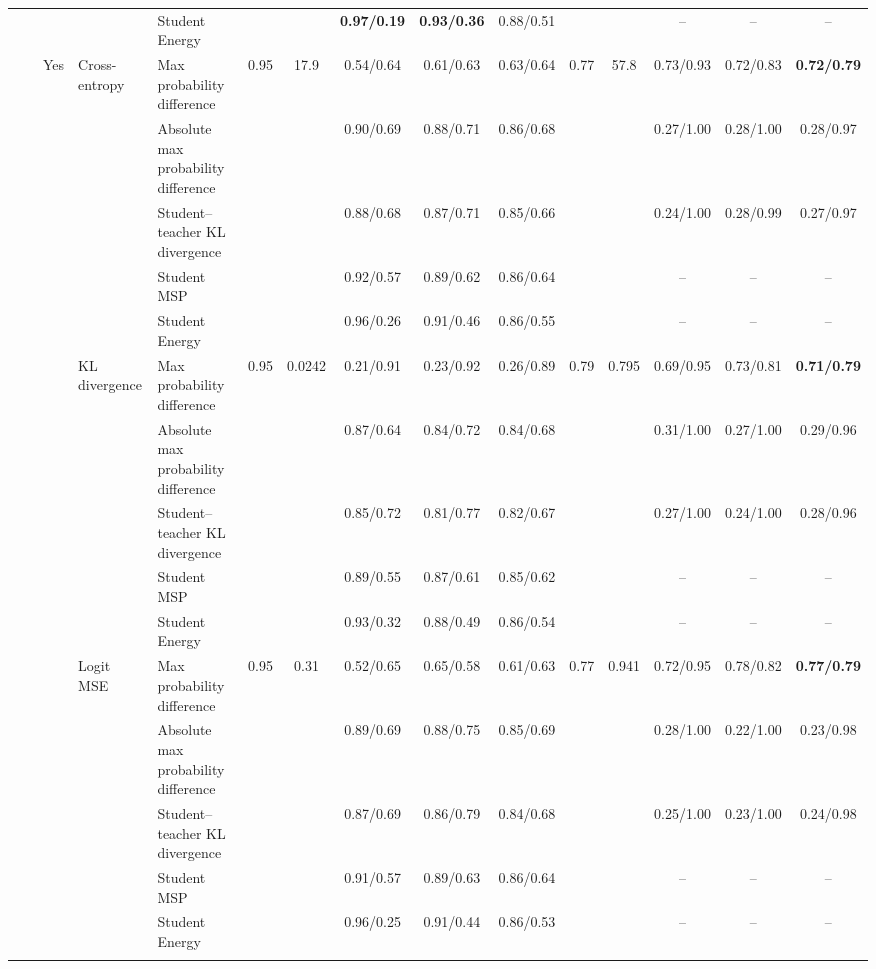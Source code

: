 \documentclass[border=2pt]{standalone}
\begin{document}
\begin{tabular}{lllllcccccccccc}
 &  &  &  & Student Energy &  &  & \textbf{0.97/0.19} & \textbf{0.93/0.36} & 0.88/0.51 &  &  & -- & -- & -- \\
 &  & Yes & Cross-entropy & Max probability difference & 0.95 & 17.9 & 0.54/0.64 & 0.61/0.63 & 0.63/0.64 & 0.77 & 57.8 & 0.73/0.93 & 0.72/0.83 & \textbf{0.72/0.79} \\
 &  &  &  & Absolute max probability difference &  &  & 0.90/0.69 & 0.88/0.71 & 0.86/0.68 &  &  & 0.27/1.00 & 0.28/1.00 & 0.28/0.97 \\
 &  &  &  & Student--teacher KL divergence &  &  & 0.88/0.68 & 0.87/0.71 & 0.85/0.66 &  &  & 0.24/1.00 & 0.28/0.99 & 0.27/0.97 \\
 &  &  &  & Student MSP &  &  & 0.92/0.57 & 0.89/0.62 & 0.86/0.64 &  &  & -- & -- & -- \\
 &  &  &  & Student Energy &  &  & 0.96/0.26 & 0.91/0.46 & 0.86/0.55 &  &  & -- & -- & -- \\
 &  &  & KL divergence & Max probability difference & 0.95 & 0.0242 & 0.21/0.91 & 0.23/0.92 & 0.26/0.89 & 0.79 & 0.795 & 0.69/0.95 & 0.73/0.81 & \textbf{0.71/0.79} \\
 &  &  &  & Absolute max probability difference &  &  & 0.87/0.64 & 0.84/0.72 & 0.84/0.68 &  &  & 0.31/1.00 & 0.27/1.00 & 0.29/0.96 \\
 &  &  &  & Student--teacher KL divergence &  &  & 0.85/0.72 & 0.81/0.77 & 0.82/0.67 &  &  & 0.27/1.00 & 0.24/1.00 & 0.28/0.96 \\
 &  &  &  & Student MSP &  &  & 0.89/0.55 & 0.87/0.61 & 0.85/0.62 &  &  & -- & -- & -- \\
 &  &  &  & Student Energy &  &  & 0.93/0.32 & 0.88/0.49 & 0.86/0.54 &  &  & -- & -- & -- \\
 &  &  & Logit MSE & Max probability difference & 0.95 & 0.31 & 0.52/0.65 & 0.65/0.58 & 0.61/0.63 & 0.77 & 0.941 & 0.72/0.95 & 0.78/0.82 & \textbf{0.77/0.79} \\
 &  &  &  & Absolute max probability difference &  &  & 0.89/0.69 & 0.88/0.75 & 0.85/0.69 &  &  & 0.28/1.00 & 0.22/1.00 & 0.23/0.98 \\
 &  &  &  & Student--teacher KL divergence &  &  & 0.87/0.69 & 0.86/0.79 & 0.84/0.68 &  &  & 0.25/1.00 & 0.23/1.00 & 0.24/0.98 \\
 &  &  &  & Student MSP &  &  & 0.91/0.57 & 0.89/0.63 & 0.86/0.64 &  &  & -- & -- & -- \\
 &  &  &  & Student Energy &  &  & 0.96/0.25 & 0.91/0.44 & 0.86/0.53 &  &  & -- & -- & -- \\
\addlinespace

\end{tabular}
\end{document}
